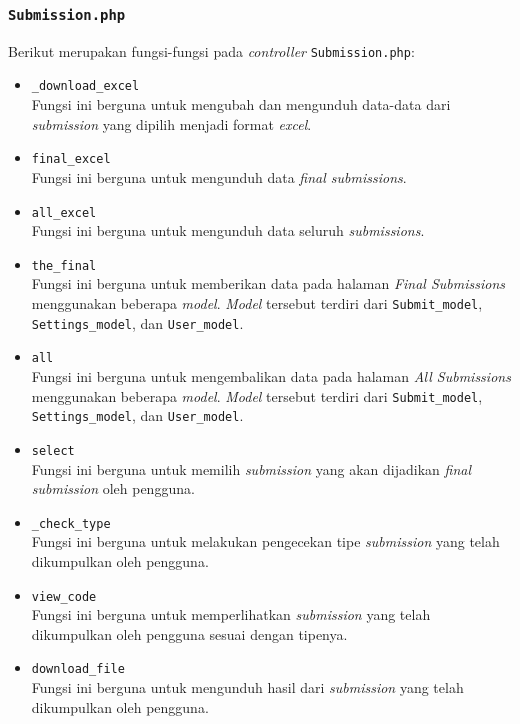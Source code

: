 \subsubsection{\texttt{Submission.php}}
Berikut merupakan fungsi-fungsi pada \textit{controller} \texttt{Submission.php}:
\begin{itemize}
	\item \texttt{\_download\_excel}\\
	Fungsi ini berguna untuk mengubah dan mengunduh data-data dari \textit{submission} yang dipilih menjadi format \textit{excel}.
	\item \texttt{final\_excel}\\
	Fungsi ini berguna untuk mengunduh data \textit{final submissions}.
	\item \texttt{all\_excel}\\
	Fungsi ini berguna untuk mengunduh data seluruh \textit{submissions}.
	\item \texttt{the\_final}\\
	Fungsi ini berguna untuk memberikan data pada halaman \textit{Final Submissions} menggunakan beberapa \textit{model}. \textit{Model} tersebut terdiri dari \texttt{Submit\_model}, \texttt{Settings\_model}, dan \texttt{User\_model}.
	\item \texttt{all}\\
	Fungsi ini berguna untuk mengembalikan data pada halaman \textit{All Submissions} menggunakan beberapa \textit{model}. \textit{Model} tersebut terdiri dari \texttt{Submit\_model}, \texttt{Settings\_model}, dan \texttt{User\_model}.
	\item \texttt{select}\\
	Fungsi ini berguna untuk memilih \textit{submission} yang akan dijadikan \textit{final submission} oleh pengguna.
	\item \texttt{\_check\_type}\\
	Fungsi ini berguna untuk melakukan pengecekan tipe \textit{submission} yang telah dikumpulkan oleh pengguna.
	\item \texttt{view\_code}\\
	Fungsi ini berguna untuk memperlihatkan \textit{submission} yang telah dikumpulkan oleh pengguna sesuai dengan tipenya.
	\item \texttt{download\_file}\\
	Fungsi ini berguna untuk mengunduh hasil dari \textit{submission} yang telah dikumpulkan oleh pengguna.
\end{itemize}
